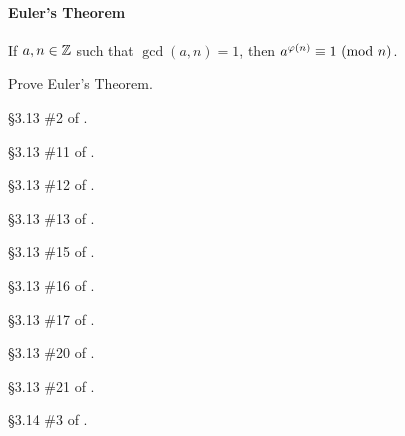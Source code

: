 		\paragraph*{Euler's Theorem}

		\begin{theorem}[Euler]
			If $a,n\in\mathbb{Z}$ such that $\gcd(a,n)=1$, then $a^{\varphi(n)} \equiv 1 \mbox{\ $\left(\mathrm{mod}\ {n}\right)$}$.
		\end{theorem}

		\begin{problem}  [10 points]
			Prove Euler's Theorem.
		\end{problem}

		\begin{problem}[10 points]
			\S3.13 \#2 of \cite{tw}.
		\end{problem}

		\begin{problem}[10 points]
			\S3.13 \#11 of \cite{tw}.
		\end{problem}

		\begin{problem}[10 points]
			\S3.13 \#12 of \cite{tw}.
		\end{problem}

		\begin{problem}[10 points]
			\S3.13 \#13 of \cite{tw}.
		\end{problem}

		\begin{problem}[10 points]
			\S3.13 \#15 of \cite{tw}.
		\end{problem}

		\begin{problem}[10 points]
			\S3.13 \#16 of \cite{tw}.
		\end{problem}

		\begin{problem}[10 points]
			\S3.13 \#17 of \cite{tw}.
		\end{problem}

		\begin{problem}[20 points]
			\S3.13 \#20 of \cite{tw}.
		\end{problem}

		\begin{problem}[20 points]
			\S3.13 \#21 of \cite{tw}.
		\end{problem}

		\begin{problem}[10 points]
			\S3.14 \#3 of \cite{tw}.
		\end{problem}


